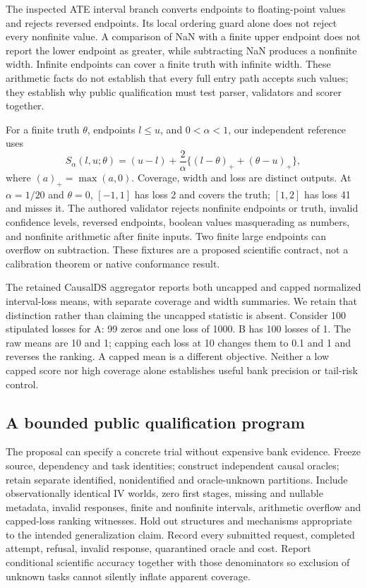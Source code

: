 The inspected ATE interval branch converts endpoints to floating-point values and rejects reversed endpoints. Its local ordering guard alone does not reject every nonfinite value. A comparison of NaN with a finite upper endpoint does not report the lower endpoint as greater, while subtracting NaN produces a nonfinite width. Infinite endpoints can cover a finite truth with infinite width. These arithmetic facts do not establish that every full entry path accepts such values; they establish why public qualification must test parser, validators and scorer together.~\citep{exec25_bor_sources,exec25_bor_reference}

For a finite truth $\theta$, endpoints $l\leq u$, and $0<\alpha<1$, our independent reference uses
\[
S_\alpha(l,u;\theta)=(u-l)+\frac{2}{\alpha}
\{(l-\theta)_+ +(\theta-u)_+\},
\]
where $(a)_+=\max(a,0)$. Coverage, width and loss are distinct outputs. At $\alpha=1/20$ and $\theta=0$, $[-1,1]$ has loss 2 and covers the truth; $[1,2]$ has loss 41 and misses it. The authored validator rejects nonfinite endpoints or truth, invalid confidence levels, reversed endpoints, boolean values masquerading as numbers, and nonfinite arithmetic after finite inputs. Two finite large endpoints can overflow on subtraction. These fixtures are a proposed scientific contract, not a calibration theorem or native conformance result.~\citep{exec25_bor_reference}

The retained CausalDS aggregator reports both uncapped and capped normalized interval-loss means, with separate coverage and width summaries. We retain that distinction rather than claiming the uncapped statistic is absent. Consider 100 stipulated losses for A: 99 zeros and one loss of 1000. B has 100 losses of 1. The raw means are 10 and 1; capping each loss at 10 changes them to 0.1 and 1 and reverses the ranking. A capped mean is a different objective. Neither a low capped score nor high coverage alone establishes useful bank precision or tail-risk control.~\citep{exec25_bor_sources,exec25_bor_reference}

\subsection{A bounded public qualification program}

The proposal can specify a concrete trial without expensive bank evidence. Freeze source, dependency and task identities; construct independent causal oracles; retain separate identified, nonidentified and oracle-unknown partitions. Include observationally identical IV worlds, zero first stages, missing and nullable metadata, invalid responses, finite and nonfinite intervals, arithmetic overflow and capped-loss ranking witnesses. Hold out structures and mechanisms appropriate to the intended generalization claim. Record every submitted request, completed attempt, refusal, invalid response, quarantined oracle and cost. Report conditional scientific accuracy together with those denominators so exclusion of unknown tasks cannot silently inflate apparent coverage.~\citep{exec25_bor_reference}

